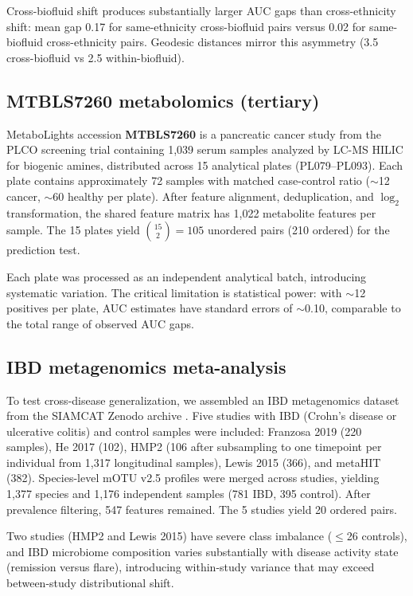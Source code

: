 \documentclass{article}
\begin{document}
Cross-biofluid shift produces substantially larger AUC gaps than cross-ethnicity shift: mean gap 0.17 for same-ethnicity cross-biofluid pairs versus 0.02 for same-biofluid cross-ethnicity pairs. Geodesic distances mirror this asymmetry (3.5 cross-biofluid vs 2.5 within-biofluid).

\subsection{MTBLS7260 metabolomics (tertiary)}
\label{sec:metab_data}

MetaboLights accession \textbf{MTBLS7260} \citep{leonletelier2024contributions} is a pancreatic cancer study from the PLCO screening trial containing 1{,}039 serum samples analyzed by LC-MS HILIC for biogenic amines, distributed across 15 analytical plates (PL079--PL093). Each plate contains approximately 72 samples with matched case-control ratio ($\sim$12 cancer, $\sim$60 healthy per plate). After feature alignment, deduplication, and $\log_2$ transformation, the shared feature matrix has 1{,}022 metabolite features per sample. The 15 plates yield $\binom{15}{2} = 105$ unordered pairs (210 ordered) for the prediction test.

Each plate was processed as an independent analytical batch, introducing systematic variation. The critical limitation is statistical power: with $\sim$12 positives per plate, AUC estimates have standard errors of $\sim$0.10, comparable to the total range of observed AUC gaps.

\subsection{IBD metagenomics meta-analysis}
\label{sec:ibd_data}

To test cross-disease generalization, we assembled an IBD metagenomics dataset from the SIAMCAT Zenodo archive \citep{wirbel2021siamcat}. Five studies with IBD (Crohn's disease or ulcerative colitis) and control samples were included: Franzosa 2019 (220 samples), He 2017 (102), HMP2 (106 after subsampling to one timepoint per individual from 1{,}317 longitudinal samples), Lewis 2015 (366), and metaHIT (382). Species-level mOTU v2.5 profiles were merged across studies, yielding 1{,}377 species and 1{,}176 independent samples (781 IBD, 395 control). After prevalence filtering, 547 features remained. The 5 studies yield 20 ordered pairs.

Two studies (HMP2 and Lewis 2015) have severe class imbalance ($\leq$26 controls), and IBD microbiome composition varies substantially with disease activity state (remission versus flare), introducing within-study variance that may exceed between-study distributional shift.
\end{document}
